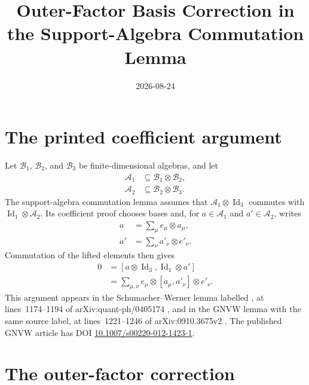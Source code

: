 \documentclass[11pt]{article}
\title{Outer-Factor Basis Correction in the Support-Algebra Commutation Lemma}
\author{}
\date{2026-08-24}
\begin{document}
\maketitle
{}

\section{The printed coefficient argument}

Let $\mathcal B_1$, $\mathcal B_2$, and $\mathcal B_3$ be
finite-dimensional algebras, and let
\begin{align}
    \mathcal A_1
        &\subseteq \mathcal B_1\otimes\mathcal B_2,
    \label{eq:gnvw12_support_algebra_outer_factor_basis_first_inclusion}\\
    \mathcal A_2
        &\subseteq \mathcal B_2\otimes\mathcal B_3.
    \label{eq:gnvw12_support_algebra_outer_factor_basis_second_inclusion}
\end{align}
The support-algebra commutation lemma assumes that
$\mathcal A_1\otimes\operatorname{Id}_3$ commutes with
$\operatorname{Id}_1\otimes\mathcal A_2$. Its coefficient proof chooses
bases and, for $a\in\mathcal A_1$ and $a'\in\mathcal A_2$, writes
\begin{align}
    a
        &=\sum_\mu e_\mu\otimes a_\mu,
    \label{eq:gnvw12_support_algebra_outer_factor_basis_first_expansion}\\
    a'
        &=\sum_\nu a'_\nu\otimes e'_\nu.
    \label{eq:gnvw12_support_algebra_outer_factor_basis_second_expansion}
\end{align}
Commutation of the lifted elements then gives
\begin{align}
    0
        &=[a\otimes\operatorname{Id}_3,
            \operatorname{Id}_1\otimes a']
    \label{eq:gnvw12_support_algebra_outer_factor_basis_lifted_commutator}\\
        &=\sum_{\mu,\nu}
            e_\mu\otimes[a_\mu,a'_\nu]\otimes e'_\nu.
    \label{eq:gnvw12_support_algebra_outer_factor_basis_commutator_expansion}
\end{align}
This argument appears in the Schumacher--Werner lemma labelled
, at lines~1174--1194 of arXiv:quant-ph/0405174
\cite{SchumacherWerner2004QCA}, and in the GNVW lemma with the same source
label, at lines~1221--1246 of arXiv:0910.3675v2
\cite{Gross2012IndexTheory}. The published GNVW article has DOI
\href{https://doi.org/10.1007/s00220-012-1423-1}
{10.1007/s00220-012-1423-1}.

\section{The outer-factor correction}
\end{document}
